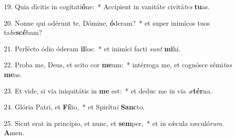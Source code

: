 19. Quia dícitis in cogitati\textbf{ó}ne:~*  Accípient in vanitáte civitá\textit{tes} \textbf{tu}as.\

20. Nonne qui odérunt te, Dómine, \textbf{ó}deram?~*  et super inimícos tuos ta\textit{be}\textbf{scé}bam?\

21. Perfécto ódio óderam \textbf{il}los:~*  et inimíci facti \textit{sunt} \textbf{mi}hi.\

22. Proba me, Deus, et scito cor \textbf{me}um:~*  intérroga me, et cognósce sémi\textit{tas} \textbf{me}as.\

23. Et vide, si via iniquitátis in \textbf{me} est:~*  et deduc me in via \textit{æ}\textbf{tér}na.\

24. Glória Patri, et \textbf{Fí}lio,~*  et Spirítu\textit{i} \textbf{Sanc}to.\

25. Sicut erat in princípio, et nunc, et \textbf{sem}per,~*  et in sǽcula sæculó\textit{rum}. \textbf{A}men.\

